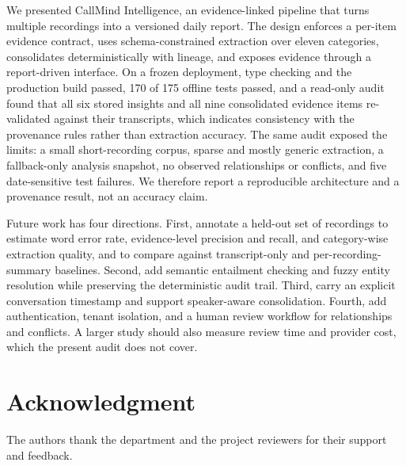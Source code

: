 \documentclass[10pt,a4paper]{article}
\begin{document}
We presented CallMind Intelligence, an evidence-linked pipeline that turns multiple
recordings into a versioned daily report. The design enforces a per-item evidence contract,
uses schema-constrained extraction over eleven categories, consolidates deterministically
with lineage, and exposes evidence through a report-driven interface. On a frozen
deployment, type checking and the production build passed, 170 of 175 offline tests passed,
and a read-only audit found that all six stored insights and all nine consolidated evidence
items re-validated against their transcripts, which indicates consistency with the
provenance rules rather than extraction accuracy. The same audit exposed the limits: a small
short-recording corpus, sparse and mostly generic extraction, a fallback-only analysis
snapshot, no observed relationships or conflicts, and five date-sensitive test failures.
We therefore report a reproducible architecture and a provenance result, not an accuracy
claim.

Future work has four directions. First, annotate a held-out set of recordings to estimate
word error rate, evidence-level precision and recall, and category-wise extraction quality,
and to compare against transcript-only and per-recording-summary baselines. Second, add
semantic entailment checking and fuzzy entity resolution while preserving the deterministic
audit trail. Third, carry an explicit conversation timestamp and support speaker-aware
consolidation. Fourth, add authentication, tenant isolation, and a human review workflow
for relationships and conflicts. A larger study should also measure review time and
provider cost, which the present audit does not cover.

\section*{Acknowledgment}

The authors thank the department and the project reviewers for their support and
feedback.



\end{document}
